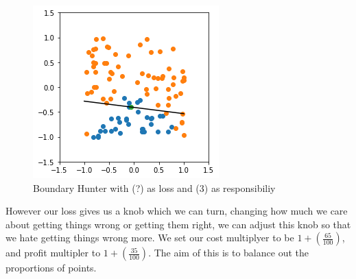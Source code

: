 \documentclass{article}
\begin{document}
\begin{figure}[H]
\centering
  \begin{minipage}[b]{0.4\textwidth}
    \includegraphics[width=\textwidth]{BoundaryHunter-Attempt4-01.png}
    \caption{Boundary Hunter with (?) as loss and (3) as responsibiliy}
  \end{minipage}
  \hfill
\end{figure}

However our loss gives us a knob which we can turn, changing how much we care about getting things wrong or getting them right, we can adjust this knob so that we hate getting things wrong more. We set our cost multiplyer to be $1 + (\frac{65}{100})$, and profit multipler to  $1 + (\frac{35}{100})$. The aim of this is to balance out the proportions of points.
\end{document}
